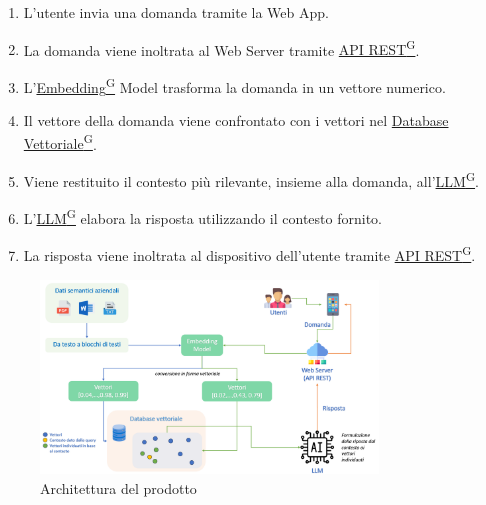 \begin{enumerate}
    \item L'utente invia una domanda tramite la Web App.
    \item La domanda viene inoltrata al Web Server tramite \href{https://code7crusaders.github.io/docs/RTB/documentazione_interna/glossario.html#api-rest-representational-state-transfer}{API REST\textsuperscript{G}}.
    \item L'\href{https://code7crusaders.github.io/docs/RTB/documentazione_interna/glossario.html#embedding}{Embedding\textsuperscript{G}} Model trasforma la domanda in un vettore numerico.
    \item Il vettore della domanda viene confrontato con i vettori nel \href{https://code7crusaders.github.io/docs/RTB/documentazione_interna/glossario.html#database-vettoriale}{Database Vettoriale\textsuperscript{G}}.
    \item Viene restituito il contesto più rilevante, insieme alla domanda, all'\href{https://code7crusaders.github.io/docs/RTB/documentazione_interna/glossario.html#llm-large-language-model}{LLM\textsuperscript{G}}.
    \item L'\href{https://code7crusaders.github.io/docs/RTB/documentazione_interna/glossario.html#llm-large-language-model}{LLM\textsuperscript{G}} elabora la risposta utilizzando il contesto fornito.
    \item La risposta viene inoltrata al dispositivo dell'utente tramite \href{https://code7crusaders.github.io/docs/RTB/documentazione_interna/glossario.html#api-rest-representational-state-transfer}{API REST\textsuperscript{G}}.
\end{enumerate}

\begin{figure}[h]
    \centering
    \includegraphics[width=0.8\textwidth]{img/architettura.png}
    \caption{Architettura del prodotto}
    \label{fig:architettura}
\end{figure}

